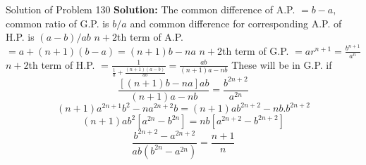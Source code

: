 \documentclass[aspectratio=1610,8pt]{beamer}
\begin{document}
\begin{frame}{Solution of Problem 130}
  \textbf{Solution:} The common difference of A.P. $= b - a,$ common ratio of G.P. is $b/a$ and common difference for corresponding
  A.P. of H.P. is $(a - b)/ab$
  \linebreak\linebreak
  $n + 2$th term of A.P. $= a + (n + 1)(b - a) = (n + 1)b - na$
  \linebreak\linebreak
  $n + 2$th term of G.P. $= ar^{n + 1} = \frac{b^{n + 1}}{a^n}$
  \linebreak\linebreak
  $n + 2$th term of H.P. $= \frac{1}{\frac{1}{a} + \frac{(n + 1)(a - b)}{ab}} = \frac{ab}{(n + 1)a - nb}$
  \linebreak\linebreak
  These will be in G.P. if
  $$\frac{[(n + 1)b - na]ab}{(n + 1)a - nb} = \frac{b^{2n + 2}}{a^{2n}}$$
  $$(n + 1)a^{2n + 1}b^2 - na^{2n + 2}b = (n + 1)ab^{2n + 2} - nb.b^{2n + 2}$$
  $$(n + 1)ab^2[a^{2n} - b^{2n}] = nb[a^{2n + 2} - b^{2n + 2}]$$
  $$\frac{b^{2n + 2} - a^{2n + 2}}{ab(b^{2n} - a^{2n})} = \frac{n + 1}{n}$$
\end{frame}
\end{document}
